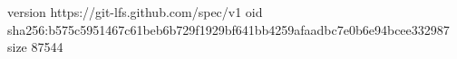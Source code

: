 version https://git-lfs.github.com/spec/v1
oid sha256:b575c5951467c61beb6b729f1929bf641bb4259afaadbc7e0b6e94bcee332987
size 87544
